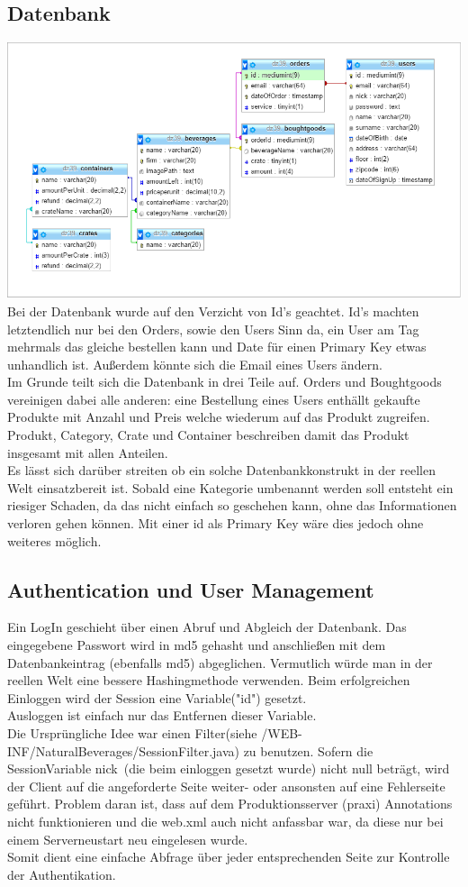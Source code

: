 \documentclass[a4paper, 11pt]{article}
\begin{document}
\subsection{Datenbank}
\includegraphics[width=\textwidth]{databaseDiagram.PNG}
Bei der Datenbank wurde auf den Verzicht von Id's geachtet. Id's machten letztendlich nur bei den Orders, sowie den Users Sinn da, ein User am Tag mehrmals das gleiche bestellen kann und Date für einen Primary Key etwas unhandlich ist. Außerdem könnte sich die Email eines Users ändern. \\
Im Grunde teilt sich die Datenbank in drei Teile auf. Orders und Boughtgoods vereinigen dabei alle anderen: eine Bestellung eines Users enthällt gekaufte Produkte mit Anzahl und Preis welche wiederum auf das Produkt zugreifen. Produkt, Category, Crate und Container beschreiben damit das Produkt insgesamt mit allen Anteilen. \\
Es lässt sich darüber streiten ob ein solche Datenbankkonstrukt in der reellen Welt einsatzbereit ist. Sobald eine Kategorie umbenannt werden soll entsteht ein riesiger Schaden, da das nicht einfach so geschehen kann, ohne das Informationen verloren gehen können. Mit einer id als Primary Key wäre dies jedoch ohne weiteres möglich.

\subsection{Authentication und User Management}
Ein LogIn geschieht über einen Abruf und Abgleich der Datenbank. Das eingegebene Passwort wird in md5 gehasht und anschließen mit dem Datenbankeintrag (ebenfalls md5) abgeglichen.
Vermutlich würde man in der reellen Welt eine bessere Hashingmethode verwenden. Beim erfolgreichen Einloggen wird der Session eine Variable("id") gesetzt. \\
Ausloggen ist einfach nur das Entfernen dieser Variable.\\
Die Ursprüngliche Idee war einen Filter(siehe /WEB-INF/NaturalBeverages/SessionFilter.java) zu benutzen. Sofern die SessionVariable \grqq nick\grqq \ (die beim einloggen gesetzt wurde) nicht null beträgt, wird der Client auf die angeforderte Seite weiter- oder ansonsten auf eine Fehlerseite geführt. Problem daran ist, dass auf dem Produktionsserver (praxi) Annotations nicht funktionieren und die web.xml auch nicht anfassbar war, da diese nur bei einem Serverneustart neu eingelesen wurde. \\
Somit dient eine einfache Abfrage über jeder entsprechenden Seite zur Kontrolle der Authentikation.  
\end{document}
